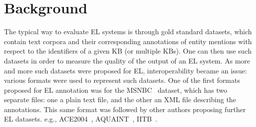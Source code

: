 \documentclass[sigconf]{acmart}
\begin{document}



\section{Background}
\label{sec:nif}


The typical way to evaluate EL systems is through gold standard datasets, which contain text corpora and their corresponding annotations of entity mentions with respect to the identifiers of a given KB (or multiple KBs). One can then use such datasets in order to measure the quality of the output of an EL system. As more and more such datasets were proposed for EL, interoperability became an issue: various formats were used to represent such datasets. One of the first formats proposed for EL annotation was for the MSNBC~\cite{cucerzan2007large} dataset, which has two separate files: one a plain text file, and the other an XML file describing the annotations. This same format was followed by other authors proposing further EL datasets. e.g., ACE2004~\cite{aquaint}, AQUAINT~\cite{aquaint}, IITB~\cite{IITB2009}.
\end{document}
